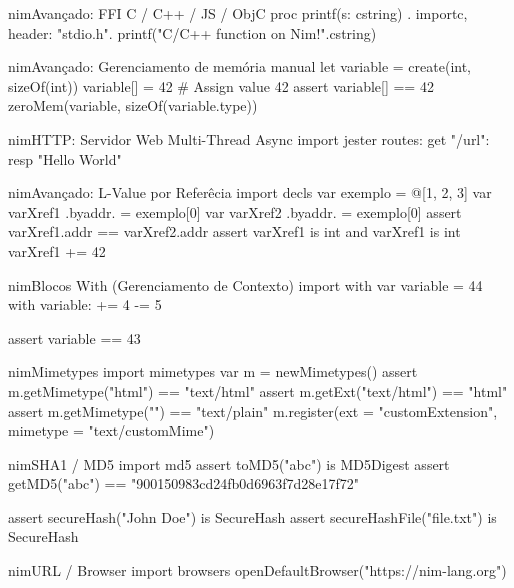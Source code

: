 \documentclass[10pt, a4paper]{article}
\begin{document}
\begin{multicols}{4}
\begin{codebox}{nim}{Avançado: FFI C / C++ / JS / ObjC}
proc printf(s: cstring) {.
  importc, header: "stdio.h".}
printf("C/C++ function on Nim!".cstring)
\end{codebox}


\begin{codebox}{nim}{Avançado: Gerenciamento de memória manual}
let variable = create(int, sizeOf(int))
variable[] = 42  # Assign value 42
assert variable[] == 42
zeroMem(variable, sizeOf(variable.type))
\end{codebox}


\begin{codebox}{nim}{HTTP: Servidor Web Multi-Thread Async}
import jester
routes: get "/url": resp "Hello World"
\end{codebox}


\begin{codebox}{nim}{Avançado: L-Value por Referêcia}
import decls
var exemplo = @[1, 2, 3]
var varXref1 {.byaddr.} = exemplo[0]
var varXref2 {.byaddr.} = exemplo[0]
assert varXref1.addr == varXref2.addr
assert varXref1 is int and varXref1 is int
varXref1 += 42
\end{codebox}


\begin{codebox}{nim}{Blocos With (Gerenciamento de Contexto)}
import with
var variable = 44
with variable:
  += 4
  -= 5

assert variable == 43
\end{codebox}


\begin{codebox}{nim}{Mimetypes}
import mimetypes
var m = newMimetypes()
assert m.getMimetype("html") == "text/html"
assert m.getExt("text/html") == "html"
assert m.getMimetype("") == "text/plain"
m.register(ext = "customExtension", mimetype = "text/customMime")
\end{codebox}


\begin{codebox}{nim}{SHA1 / MD5}
import md5
assert toMD5("abc") is MD5Digest
assert getMD5("abc") == "900150983cd24fb0d6963f7d28e17f72"

assert secureHash("John Doe") is SecureHash
assert secureHashFile("file.txt") is SecureHash
\end{codebox}


\begin{codebox}{nim}{URL / Browser}
import browsers
openDefaultBrowser("https://nim-lang.org")
\end{codebox}



\end{multicols}
\end{document}
